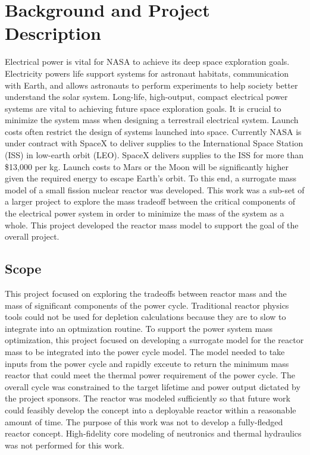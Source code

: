 \chapter{Background and Project Description}
Electrical power is vital for NASA to achieve its deep space exploration goals.
Electricity powers life support systems for astronaut habitats, communication
with Earth, and allows astronauts to perform experiments to help society better
understand the solar system. Long-life, high-output, compact electrical power
systems are vital to achieving future space exploration goals. It is crucial to
minimize the system mass when designing a terrestrail electrical system. Launch costs 
often restrict the design of systems launched
into space. Currently NASA is under contract with SpaceX to deliver supplies to
the International Space Station (ISS) in low-earth orbit (LEO). SpaceX delivers
supplies to the ISS for more than \$13,000 per kg\citep{spacex}. Launch costs to Mars or the
Moon will be significantly higher given the required energy to escape Earth's
orbit. To this end, a surrogate mass model of a small fission
nuclear reactor was developed. This work was a sub-set of a larger
project to explore the mass tradeoff between the critical components of the
electrical power system in order to minimize the mass of the system as a whole.
This project developed the reactor mass model to support the goal of the overall
project.

\section{Scope}
This project focused on exploring the tradeoffs between reactor mass and the
mass of significant components of the power cycle. Traditional reactor physics
tools could not be used for depletion calculations because they are to slow to
integrate into an optmization routine. To support the power system mass optimization, this project focused on
developing a surrogate model for the reactor mass to be integrated into the
power cycle model. The model needed to take inputs from the power cycle and
rapidly exceute to return the minimum mass reactor that could meet the thermal
power requirement of the power cycle. The overall cycle was constrained to the
target lifetime and power output dictated by the project sponsors. The reactor
was modeled sufficiently so that future work could feasibly develop the
concept into a deployable reactor within a reasonable amount of time.
The purpose of this work was not to develop a fully-fledged reactor concept.
High-fidelity core modeling of neutronics and thermal hydraulics was not
performed for this work.

